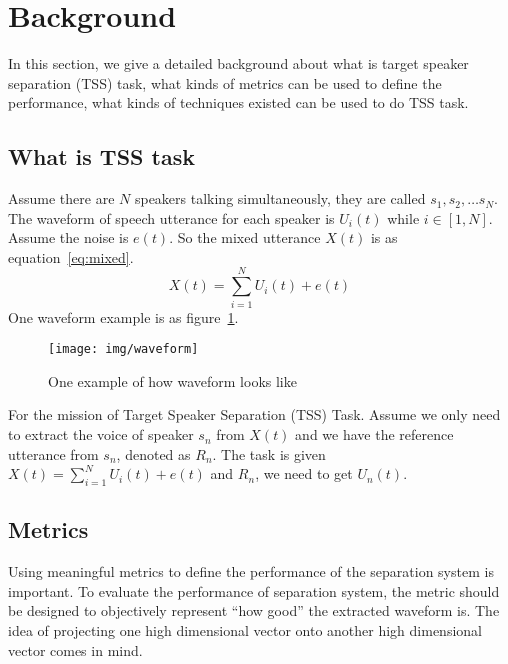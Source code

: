 

\section{Background}\label{sec:background}

In this section, we give a detailed background about what is target speaker separation (TSS) task, what kinds of metrics can be used to define the performance, what kinds of techniques existed can be used to do TSS task.

\subsection{What is TSS task}\label{subsec:what-is-tss-task}

Assume there are $N$ speakers talking simultaneously, they are called $s_1, s_2, \dots s_N$. The waveform of speech utterance for each speaker is $U_i\left( t \right)$ while $i\in\left[ 1, N \right]$. Assume the noise is $e\left( t \right)$.
So the mixed utterance $X\left( t \right)$ is as equation~\ref{eq:mixed}.
\begin{equation}
    X\left( t \right) = \sum\limits_{i=1}^N U_i\left( t \right) + e\left( t \right)
    \label{eq:mixed}
\end{equation}
One waveform example is as figure~\ref{fig:waveform}.
\begin{figure}[!htbp]
    \centering
    \texttt{[image: img/waveform]}
    \caption{One example of how waveform looks like}
    \label{fig:waveform}
\end{figure}

For the mission of Target Speaker Separation (TSS) Task. Assume we only need to extract the voice of speaker $s_n$ from $X\left( t \right)$ and we have the reference utterance from $s_n$, denoted as $R_n$.
The task is given $X\left( t \right) = \sum\limits_{i=1}^N U_i\left( t \right) + e\left( t \right)$ and $R_n$, we need to get $U_n\left( t \right)$.

\subsection{Metrics}\label{subsec:metrics}

Using meaningful metrics to define the performance of the separation system is important.
To evaluate the performance of separation system, the metric should be designed to objectively represent ``how good'' the extracted waveform is.
The idea of projecting one high dimensional vector onto another high dimensional vector comes in mind.

